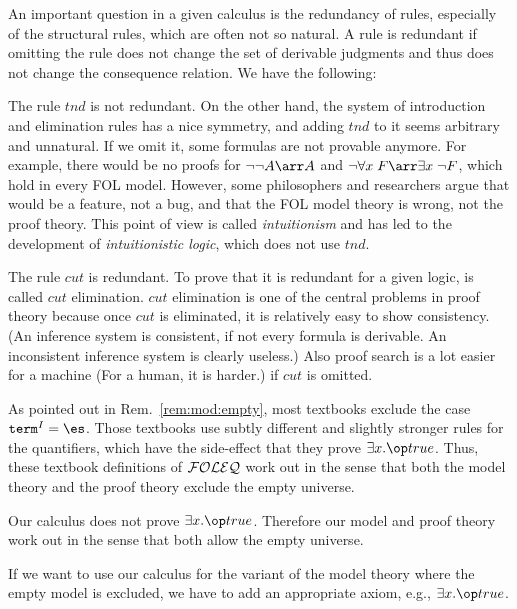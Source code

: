 An important question in a given calculus is the redundancy of rules, especially of the structural rules, which are often not so natural. A rule is redundant if omitting the rule does not change the set of derivable judgments and thus does not change the consequence relation. We have the following:

\begin{remark}
The rule $tnd$ is not redundant. On the other hand, the system of introduction and elimination rules has a nice symmetry, and adding $tnd$ to it seems arbitrary and unnatural. If we omit it, some formulas are not provable anymore. For example, there would be no proofs for $\neg\neg A\arr A$ and $\neg\forall x\;F\arr \exists x\;\neg F$, which hold in every FOL model. However, some philosophers and researchers argue that would be a feature, not a bug, and that the FOL model theory is wrong, not the proof theory. This point of view is called \emph{intuitionism} and has led to the development of \emph{intuitionistic logic}, which does not use $tnd$.
\end{remark}


\begin{remark}[Cut]
The rule $cut$ is redundant. To prove that it is redundant for a given logic, is called $cut$ elimination. $cut$ elimination is one of the central problems in proof theory because once $cut$ is eliminated, it is relatively easy to show consistency. (An inference system is consistent, if not every formula is derivable. An inconsistent inference system is clearly useless.) Also proof search is a lot easier for a machine (For a human, it is harder.) if $cut$ is omitted.
\end{remark}

\begin{remark}\label{rem:pf:empty}
As pointed out in Rem.~\ref{rem:mod:empty}, most textbooks exclude the case $\univ^I=\es$.
Those textbooks use subtly different and slightly stronger rules for the quantifiers, which have the side-effect that they prove $\exists x.\true$.
Thus, these textbook definitions of ${\mathcal{FOLEQ}}$ work out in the sense that both the model theory and the proof theory exclude the empty universe.

Our calculus does not prove $\exists x.\true$.
Therefore our model and proof theory work out in the sense that both allow the empty universe.

If we want to use our calculus for the variant of the model theory where the empty model is excluded, we have to add an appropriate axiom, e.g., $\exists x.\true$.
\end{remark}

